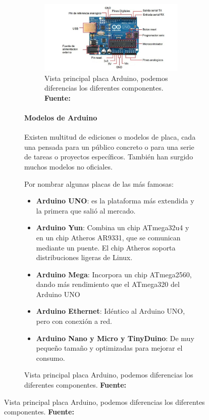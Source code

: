 \begin{itemize}
\begin{itemize}
\begin{figure}[h]
\begin{figure}[h]
\begin{figure}[h]
	\centering
	\includegraphics[width=1\linewidth]{../images/caracteristicas_arduino}
	\caption[Diagrama Arduino]{Vista principal placa Arduino, podemos diferencias los diferentes componentes. \textbf{Fuente:} \cite{ARDUINO}}
	\label{fig:arduinocasero}
\end{figure}


\paragraph{Modelos de Arduino}  

Existen multitud de ediciones o modelos de placa, cada una pensada para un público concreto o para una serie de tareas o proyectos específicos. También han surgido muchos modelos no oficiales. 


Por nombrar algunas placas de las más famosas:
\begin{itemize}
\setlength\itemsep{0.2em}	
	
\item \textbf{Arduino UNO}: es la plataforma más extendida y la primera que salió al mercado.

\item \textbf{Arduino Yun}: Combina un chip ATmega32u4 y en un chip Atheros AR9331, que se comunican mediante un puente. El chip Atheros soporta distribuciones ligeras de Linux. 

\item \textbf{Arduino Mega}: Incorpora un chip ATmega2560, dando más rendimiento que el ATmega320 del Arduino UNO

\item \textbf{Arduino Ethernet}: Idéntico al Arduino UNO, pero con conexión a red.

\item \textbf{Arduino Nano y Micro y TinyDuino}: De muy pequeño tamaño y optimizadas para mejorar el consumo. 


\end{itemize}
\end{figure}
\end{figure}
\end{itemize}
\end{itemize}

